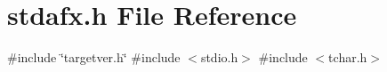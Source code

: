 \section{stdafx.\+h File Reference}
\label{stdafx_8h}
{\ttfamily \#include \char`\"{}targetver.\+h\char`\"{}}\newline
{\ttfamily \#include $<$stdio.\+h$>$}\newline
{\ttfamily \#include $<$tchar.\+h$>$}\newline
